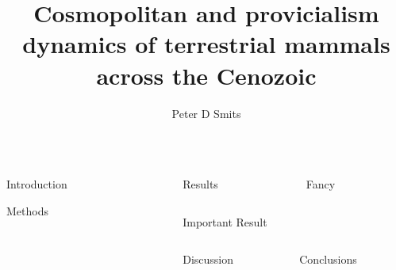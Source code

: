 \documentclass[final]{beamer}\usepackage[]{graphicx}\usepackage[]{color}
\title{Cosmopolitan and provicialism dynamics of terrestrial mammals across the Cenozoic}
\author{Peter D Smits}
\institute{Committee on Evolutionary Biology, University of Chicago}
\newlength{\onecolwid}
\newlength{\twocolwid}
\begin{document}
\begin{frame}[t]
  \begin{columns}
    \begin{column}{\onecolwid}
      \begin{block}{Introduction}
        
      \end{block}

      \begin{block}{Methods}
        
      \end{block}
    \end{column}

    \begin{column}{\twocolwid}
      \begin{columns}[t,totalwidth = \twocolwid]
        \begin{column}{\onecolwid}
          \begin{block}{Results}

          \end{block}
        \end{column}

        \begin{column}{\onecolwid}
          \begin{block}{Fancy}
           
          \end{block}
        \end{column}
      \end{columns}

      \begin{alertblock}{Important Result}
        
      \end{alertblock}

      \begin{columns}[t,totalwidth = \twocolwid]
        \begin{column}{\onecolwid}
          \begin{block}{Discussion}

          \end{block}
        \end{column}

        \begin{column}{\onecolwid}
          \begin{block}{Conclusions}
           
          \end{block}
        \end{column}
      \end{columns}
    \end{column}
  \end{columns}
\end{frame}
\end{document}
